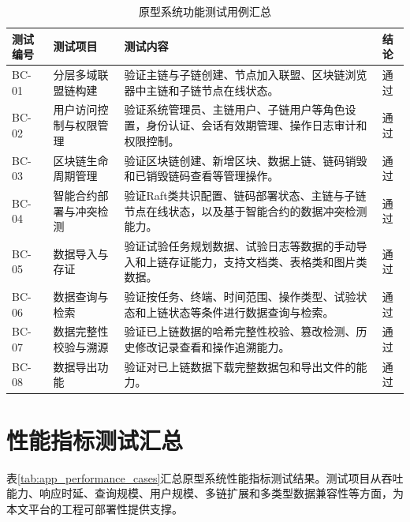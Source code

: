 \begin{appendices}
  \begin{table}[htbp]
    \centering
    \caption{原型系统功能测试用例汇总}
    \label{tab:app_function_cases}
    \begin{tabular}{p{1.8cm}p{3.2cm}p{7.0cm}p{1.5cm}}
      \toprule
      测试编号  & 测试项目        & 测试内容                                              & 结论 \\
      \midrule
      BC-01 & 分层多域联盟链构建   & 验证主链与子链创建、节点加入联盟、区块链浏览器中主链和子链节点在线状态。              & 通过 \\
      BC-02 & 用户访问控制与权限管理 & 验证系统管理员、主链用户、子链用户等角色设置，身份认证、会话有效期管理、操作日志审计和权限控制。  & 通过 \\
      BC-03 & 区块链生命周期管理   & 验证区块链创建、新增区块、数据上链、链码销毁和已销毁链码查看等管理操作。              & 通过 \\
      BC-04 & 智能合约部署与冲突检测 & 验证Raft类共识配置、链码部署状态、主链与子链节点在线状态，以及基于智能合约的数据冲突检测能力。 & 通过 \\
      BC-05 & 数据导入与存证     & 验证试验任务规划数据、试验日志等数据的手动导入和上链存证能力，支持文档类、表格类和图片类数据。   & 通过 \\
      BC-06 & 数据查询与检索     & 验证按任务、终端、时间范围、操作类型、试验状态和上链状态等条件进行数据查询与检索。         & 通过 \\
      BC-07 & 数据完整性校验与溯源  & 验证已上链数据的哈希完整性校验、篡改检测、历史修改记录查看和操作追溯能力。             & 通过 \\
      BC-08 & 数据导出功能      & 验证对已上链数据下载完整数据包和导出文件的能力。                          & 通过 \\
      \bottomrule
    \end{tabular}
  \end{table}

  \section{性能指标测试汇总}

  表\ref{tab:app_performance_cases}汇总原型系统性能指标测试结果。测试项目从吞吐能力、响应时延、查询规模、用户规模、多链扩展和多类型数据兼容性等方面，为本文平台的工程可部署性提供支撑。


\end{appendices}
